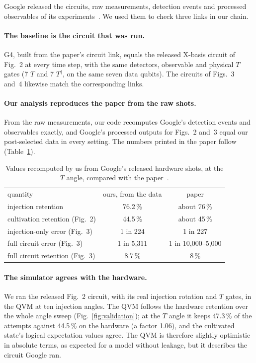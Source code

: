 \documentclass[aps,pra,reprint,superscriptaddress,longbibliography]{revtex4-2}
\newcommand{\Gfour}{\textsf{G4}}
\begin{document}
Google released the circuits, raw measurements, detection events and processed observables of its experiments~\cite{RosenfeldData}.
We used them to check three links in our chain.

\paragraph{The baseline is the circuit that was run.}
\Gfour, built from the paper's circuit link, equals the released X-basis circuit of Fig.~2 at every time step, with the same detectors, observable and physical $T$ gates (7 $T$ and 7 $T^\dagger$, on the same seven data qubits). The circuits of Figs.~3 and~4 likewise match the corresponding links.

\paragraph{Our analysis reproduces the paper from the raw shots.}
From the raw measurements, our code recomputes Google's detection events and observables exactly, and Google's processed outputs for Figs.~2 and~3 equal our post-selected data in every setting.
The numbers printed in the paper follow (Table~\ref{tab:repro}).

\begin{table}[t]
\caption{Values recomputed by us from Google's released hardware shots, at the $T$ angle, compared with the paper~\cite{Rosenfeld2025}.}
\label{tab:repro}
\begin{ruledtabular}
\begin{tabular}{lcc}
quantity & ours, from the data & paper\\
\colrule
injection retention & 76.2\,\% & about 76\,\%\\
cultivation retention (Fig.~2) & 44.5\,\% & about 45\,\%\\
injection-only error (Fig.~3) & 1 in 224 & 1 in 227\\
full circuit error (Fig.~3) & 1 in 5,311 & 1 in 10,000--5,000\\
full circuit retention (Fig.~3) & 8.7\,\% & 8\,\%\\
\end{tabular}
\end{ruledtabular}
\end{table}

\paragraph{The simulator agrees with the hardware.}
We ran the released Fig.~2 circuit, with its real injection rotation and $T$ gates, in the QVM at ten injection angles.
The QVM follows the hardware retention over the whole angle sweep (Fig.~\ref{fig:validation}); at the $T$ angle it keeps 47.3\,\% of the attempts against 44.5\,\% on the hardware (a factor 1.06), and the cultivated state's logical expectation values agree.
The QVM is therefore slightly optimistic in absolute terms, as expected for a model without leakage, but it describes the circuit Google ran.
\end{document}
